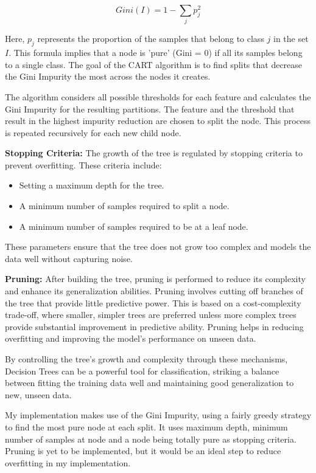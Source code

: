 \documentclass[letterpaper,10pt]{article}
\begin{document}
\[ Gini(I) = 1 - \sum_{j} p_j^2 \]

Here, \( p_j \) represents the proportion of the samples that belong to class \( j \) in the set \( I \). This formula implies that a node is 'pure' (Gini = 0) if all its samples belong to a single class. The goal of the CART algorithm is to find splits that decrease the Gini Impurity the most across the nodes it creates.

The algorithm considers all possible thresholds for each feature and calculates the Gini Impurity for the resulting partitions. The feature and the threshold that result in the highest impurity reduction are chosen to split the node. This process is repeated recursively for each new child node.

\textbf{Stopping Criteria:}
The growth of the tree is regulated by stopping criteria to prevent overfitting. These criteria include:

\begin{itemize}
    \item Setting a maximum depth for the tree.
    \item A minimum number of samples required to split a node.
    \item A minimum number of samples required to be at a leaf node.
\end{itemize}
These parameters ensure that the tree does not grow too complex and models the data well without capturing noise.

\textbf{Pruning:}
After building the tree, pruning is performed to reduce its complexity and enhance its generalization abilities. Pruning involves cutting off branches of the tree that provide little predictive power. This is based on a cost-complexity trade-off, where smaller, simpler trees are preferred unless more complex trees provide substantial improvement in predictive ability. Pruning helps in reducing overfitting and improving the model's performance on unseen data. \par

By controlling the tree's growth and complexity through these mechanisms, Decision Trees can be a powerful tool for classification, striking a balance between fitting the training data well and maintaining good generalization to new, unseen data. \par

My implementation makes use of the Gini Impurity, using a fairly greedy strategy to find the most pure node at each split. It uses maximum depth, minimum number of samples at node and a node being totally pure as stopping criteria. Pruning is yet to be implemented, but it would be an ideal step to reduce overfitting in my implementation. 
\end{document}
